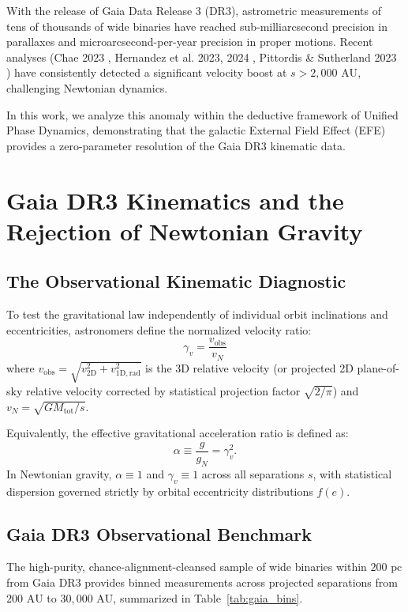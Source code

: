 \documentclass[11pt,a4paper]{article}
\begin{document}
With the release of Gaia Data Release 3 (DR3), astrometric measurements of tens of thousands of wide binaries have reached sub-milliarcsecond precision in parallaxes and microarcsecond-per-year precision in proper motions. Recent analyses (Chae 2023 \cite{chae2023}, Hernandez et al. 2023, 2024 \cite{hernandez2023, hernandez2024}, Pittordis \& Sutherland 2023 \cite{pittordis2023}) have consistently detected a significant velocity boost at $s > 2,000\text{ AU}$, challenging Newtonian dynamics.

In this work, we analyze this anomaly within the deductive framework of Unified Phase Dynamics, demonstrating that the galactic External Field Effect (EFE) provides a zero-parameter resolution of the Gaia DR3 kinematic data.

\section{Gaia DR3 Kinematics and the Rejection of Newtonian Gravity}

\subsection{The Observational Kinematic Diagnostic}
To test the gravitational law independently of individual orbit inclinations and eccentricities, astronomers define the normalized velocity ratio:
\begin{equation}
\gamma_v = \frac{v_{\mathrm{obs}}}{v_N}
\end{equation}
where $v_{\mathrm{obs}} = \sqrt{v_{2\mathrm{D}}^2 + v_{\mathrm{1D,rad}}^2}$ is the 3D relative velocity (or projected 2D plane-of-sky relative velocity corrected by statistical projection factor $\sqrt{2/\pi}$) and $v_N = \sqrt{G M_{\mathrm{tot}} / s}$.

Equivalently, the effective gravitational acceleration ratio is defined as:
\begin{equation}
\alpha \equiv \frac{g}{g_N} = \gamma_v^2.
\end{equation}
In Newtonian gravity, $\alpha \equiv 1$ and $\gamma_v \equiv 1$ across all separations $s$, with statistical dispersion governed strictly by orbital eccentricity distributions $f(e)$.

\subsection{Gaia DR3 Observational Benchmark}
The high-purity, chance-alignment-cleansed sample of wide binaries within $200\text{ pc}$ from Gaia DR3 \cite{chae2023} provides binned measurements across projected separations from $200\text{ AU}$ to $30,000\text{ AU}$, summarized in Table~\ref{tab:gaia_bins}.
\end{document}
